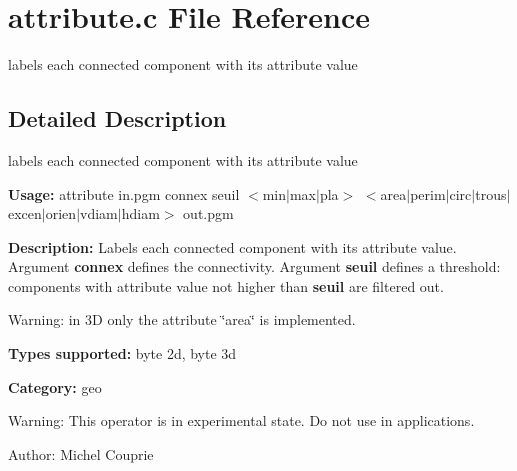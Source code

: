 \section{attribute.c File Reference}
\label{attribute_8c}
labels each connected component with its attribute value 



\subsection{Detailed Description}
labels each connected component with its attribute value 

{\bf Usage:} attribute in.pgm connex seuil $<$min$|$max$|$pla$>$ $<$area$|$perim$|$circ$|$trous$|$excen$|$orien$|$vdiam$|$hdiam$>$ out.pgm

{\bf Description:} Labels each connected component with its attribute value. Argument {\bf connex} defines the connectivity. Argument {\bf seuil} defines a threshold: components with attribute value not higher than {\bf seuil} are filtered out.

Warning: in 3D only the attribute \char`\"{}area\char`\"{} is implemented.

{\bf Types supported:} byte 2d, byte 3d

{\bf Category:} geo

\begin{Desc}
\item[Warning:]This operator is in experimental state. Do not use in applications.\end{Desc}
\begin{Desc}
\item[Author:]Michel Couprie \end{Desc}
